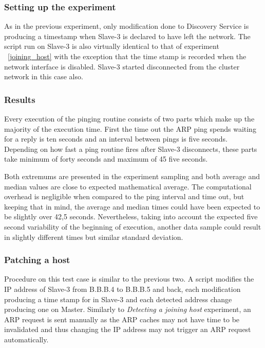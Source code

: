 \subsubsection*{Setting up the experiment}

As in the previous experiment, only modification done to Discovery Service is producing a timestamp when Slave-3 is declared to have left the network. The script run on Slave-3 is also virtually identical to that of experiment ~\ref{joining_host} with the exception that the time stamp is recorded when the network interface is disabled. Slave-3 started disconnected from the cluster network in this case also.

\subsubsection*{Results}

Every execution of the pinging routine consists of two parts which make up the majority of the execution time. First the time out the ARP ping spends waiting for a reply is ten seconds and an interval between pings is five seconds. Depending on how fast a ping routine fires after Slave-3 disconnects, these parts take minimum of forty seconds and maximum of 45 five seconds.

Both extremums are presented in the experiment sampling and both average and median values are close to expected mathematical average. The computational overhead is negligible when compared to the ping interval and time out, but keeping that in mind, the average and median times could have been expected to be slightly over 42,5 seconds. 
Nevertheless, taking into account the expected five second variability of the beginning of execution, another data sample could result in slightly different times but similar standard deviation.

\subsubsection{Patching a host}

Procedure on this test case is similar to the previous two. A script modifies the IP address of Slave-3 from B.B.B.4 to B.B.B.5 and back, each modification producing a time stamp for in Slave-3 and each detected address change producing one on Master. Similarly to \textit{Detecting a joining host} experiment, an ARP request is sent manually as the ARP caches may not have time to be invalidated and thus changing the IP address may not trigger an ARP request automatically.

